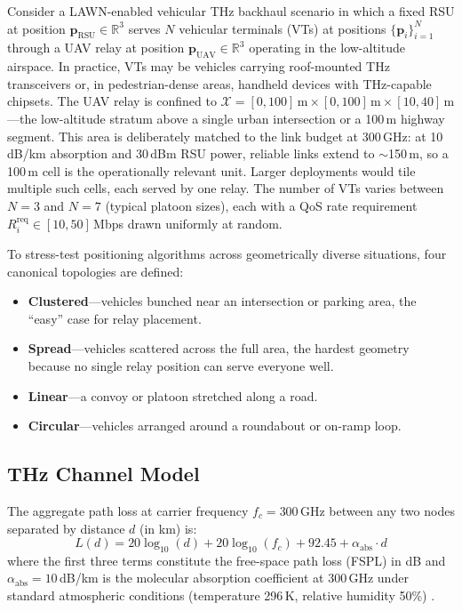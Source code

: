 \documentclass[journal]{IEEEtran}
\begin{document}
Consider a LAWN-enabled vehicular THz backhaul scenario in which a fixed RSU at position $\mathbf{p}_\text{RSU} \in \mathbb{R}^3$ serves $N$ vehicular terminals (VTs) at positions $\{\mathbf{p}_i\}_{i=1}^{N}$ through a UAV relay at position $\mathbf{p}_\text{UAV} \in \mathbb{R}^3$ operating in the low-altitude airspace. In practice, VTs may be vehicles carrying roof-mounted THz transceivers or, in pedestrian-dense areas, handheld devices with THz-capable chipsets. The UAV relay is confined to $\mathcal{X} = [0, 100]\,\text{m} \times [0, 100]\,\text{m} \times [10, 40]\,\text{m}$---the low-altitude stratum above a single urban intersection or a 100\,m highway segment. This area is deliberately matched to the link budget at 300\,GHz: at 10\,dB/km absorption and 30\,dBm RSU power, reliable links extend to ${\sim}$150\,m, so a 100\,m cell is the operationally relevant unit. Larger deployments would tile multiple such cells, each served by one relay. The number of VTs varies between $N = 3$ and $N = 7$ (typical platoon sizes), each with a QoS rate requirement $R_i^\text{req} \in [10, 50]$\,Mbps drawn uniformly at random.

To stress-test positioning algorithms across geometrically diverse situations, four canonical topologies are defined:
\begin{itemize}
    \item \textbf{Clustered}---vehicles bunched near an intersection or parking area, the ``easy'' case for relay placement.
    \item \textbf{Spread}---vehicles scattered across the full area, the hardest geometry because no single relay position can serve everyone well.
    \item \textbf{Linear}---a convoy or platoon stretched along a road.
    \item \textbf{Circular}---vehicles arranged around a roundabout or on-ramp loop.
\end{itemize}

\subsection{THz Channel Model}

The aggregate path loss at carrier frequency $f_c = 300$\,GHz between any two nodes separated by distance $d$ (in km) is:
\begin{equation}
    L(d) = 20\log_{10}(d) + 20\log_{10}(f_c) + 92.45 + \alpha_\text{abs} \cdot d
    \label{eq:pathloss}
\end{equation}
where the first three terms constitute the free-space path loss (FSPL) in dB and $\alpha_\text{abs} = 10$\,dB/km is the molecular absorption coefficient at 300\,GHz under standard atmospheric conditions (temperature 296\,K, relative humidity 50\%) \cite{jornet2011, han2022}.
\end{document}
